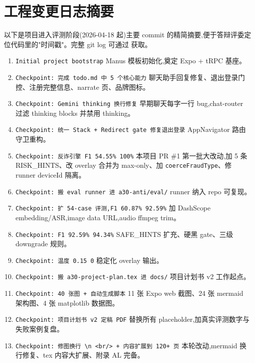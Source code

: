 \documentclass[UTF8,a4paper,12pt]{ctexart}
\newcommand{\codepath}[1]{\seqsplit{#1}}
\begin{document}
\section{工程变更日志摘要}

以下是项目进入评测阶段(2026-04-18 起)主要 commit 的精简摘要,便于答辩评委定位代码里的"时间戳"。完整 git log 可通过 \codepath{git log --oneline} 获取。

\begin{enumerate}[leftmargin=2em,itemsep=0.3em]
    \item \texttt{Initial project bootstrap} \textemdash{} Manus 模板初始化,奠定 Expo + tRPC 基座。
    \item \texttt{Checkpoint: 完成 todo.md 中 5 个核心能力} \textemdash{} 聊天助手回复修复、退出登录门控、注册完整信息、narrate 页、品牌图标。
    \item \texttt{Checkpoint: Gemini thinking 换行修复} \textemdash{} 早期聊天每字一行 bug,chat-router 过滤 thinking blocks 并禁用 thinking。
    \item \texttt{Checkpoint: 统一 Stack + Redirect gate 修复退出登录} \textemdash{} AppNavigator 路由守卫重构。
    \item \texttt{Checkpoint: 反诈引擎 F1 54.55\% \textrightarrow{} 100\%} \textemdash{} 本项目 PR \#1 第一批大改动,加 5 条 RISK\_HINTS、改 overlay 合并为 max-only、加 \texttt{coerceFraudType}、修 runner deviceId 隔离。
    \item \texttt{Checkpoint: 搬 eval runner 进 a30-anti/eval/} \textemdash{} runner 纳入 repo 可复现。
    \item \texttt{Checkpoint: 扩 54-case 评测,F1 60.87\% \textrightarrow{} 92.59\%} \textemdash{} 加 DashScope embedding/ASR,image data URL,audio ffmpeg trim。
    \item \texttt{Checkpoint: F1 92.59\% \textrightarrow{} 94.34\%} \textemdash{} SAFE\_HINTS 扩充、硬黑 gate、三级 downgrade 规则。
    \item \texttt{Checkpoint: 温度 0.15 \textrightarrow{} 0} \textemdash{} 稳定化 overlay 输出。
    \item \texttt{Checkpoint: 搬 a30-project-plan.tex 进 docs/} \textemdash{} 项目计划书 v2 工作起点。
    \item \texttt{Checkpoint: 40 张图 + 自动生成脚本} \textemdash{} 11 张 Expo web 截图、24 张 mermaid 架构图、4 张 matplotlib 数据图。
    \item \texttt{Checkpoint: 项目计划书 v2 定稿 PDF} \textemdash{} 替换所有 placeholder,加真实评测数字与失败案例复盘。
    \item \texttt{Checkpoint: 修图换行 \textbackslash n \textrightarrow{} <br/> + 内容扩展到 120+ 页} \textemdash{} 本轮改动,mermaid 换行修复、tex 内容大扩展、附录 A\textendash L 完备。
\end{enumerate}
\end{document}
